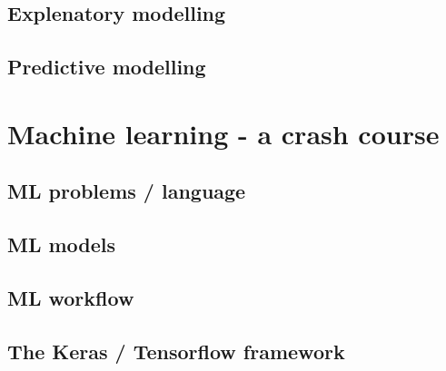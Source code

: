 \documentclass[a4paper,twoside]{tufte-book}\usepackage[]{graphicx}\usepackage[]{color}
\begin{document}
\subsection{Explenatory modelling}

\subsection{Predictive modelling}


\section{Machine learning - a crash course}

\subsection{ML problems / language}



\subsection{ML models}



\subsection{ML workflow}


\subsection{The Keras / Tensorflow framework}
\end{document}
